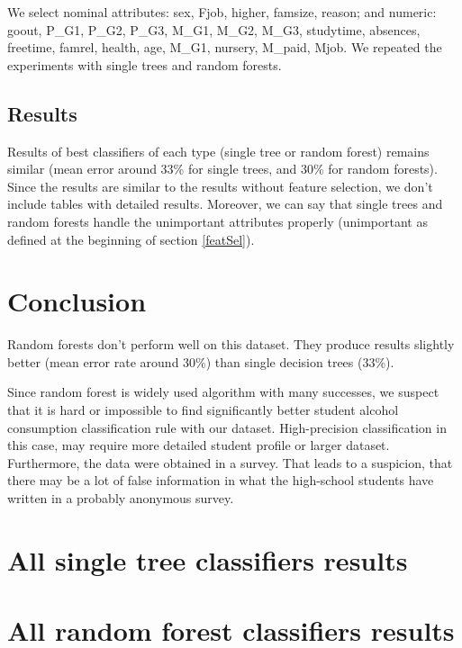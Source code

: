 \documentclass[a4paper]{article}
\begin{document}
We select nominal attributes:
sex,
Fjob,
higher,
famsize,
reason; and numeric:
goout,
P\_G1,
P\_G2,
P\_G3,
M\_G1,
M\_G2,
M\_G3,
studytime,
absences,
freetime,
famrel,
health,
age,
M\_G1,
nursery,
M\_paid,
Mjob.
We repeated the experiments with single trees and random forests.

\subsection{Results}

Results of best classifiers of each type (single tree or random forest) remains similar 
(mean error around 33\% for single trees, and 30\% for random forests).
Since the results are similar to the results without feature selection,
we don't include tables with detailed results.
Moreover, we can say that single trees and random forests handle
the unimportant attributes properly (unimportant as defined at the beginning of section \ref{featSel}).



\section{Conclusion}
Random forests don't perform well on this dataset.
They produce results slightly better (mean error rate around 30\%)
than single decision trees (33\%).

Since random forest is widely used algorithm with many successes, we suspect
that it is hard or impossible to find significantly better
student alcohol consumption classification rule
with our dataset.
High-precision classification in this case, may require more detailed
student profile or larger dataset.
Furthermore, the data were obtained in a survey.
That leads to a suspicion, that there may be a lot of false information in
what the high-school students have written in a probably anonymous survey.





\onecolumn
\newpage
\appendix
\section{All single tree classifiers results}
% 


\newpage
\section{All random forest classifiers results}
% 

\end{document}
